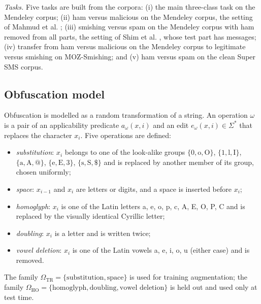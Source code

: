 

\emph{Tasks.} Five tasks are built from the corpora: (i) the main three-class task on the Mendeley corpus; (ii) ham versus malicious on the Mendeley corpus, the setting of Mahmud et al. \cite{mahmud2024}; (iii) smishing versus spam on the Mendeley corpus with ham removed from all parts, the setting of Shim et al. \cite{shim2024}, whose test part has  messages; (iv) transfer from ham versus malicious on the Mendeley corpus to legitimate versus smishing on MOZ-Smishing; and (v) ham versus spam on the clean Super SMS corpus.

\subsection{Obfuscation model}\label{sec:obfuscation}

Obfuscation is modelled as a random transformation of a string. An operation $\omega$ is a pair of an applicability predicate $a_\omega(x,i)$ and an edit $e_\omega(x,i)\in\Sigma^{*}$ that replaces the character $x_i$. Five operations are defined:
\begin{itemize}
\item \emph{substitution}: $x_i$ belongs to one of the look-alike groups $\{0,\mathrm{o},\mathrm{O}\}$, $\{1,\mathrm{l},\mathrm{I}\}$, $\{\mathrm{a},\mathrm{A},@\}$, $\{\mathrm{e},\mathrm{E},3\}$, $\{\mathrm{s},\mathrm{S},\$\}$ and is replaced by another member of its group, chosen uniformly;
\item \emph{space}: $x_{i-1}$ and $x_i$ are letters or digits, and a space is inserted before $x_i$;
\item \emph{homoglyph}: $x_i$ is one of the Latin letters a, e, o, p, c, A, E, O, P, C and is replaced by the visually identical Cyrillic letter;
\item \emph{doubling}: $x_i$ is a letter and is written twice;
\item \emph{vowel deletion}: $x_i$ is one of the Latin vowels a, e, i, o, u (either case) and is removed.
\end{itemize}
The family $\Omega_{\mathrm{TR}}=\{\text{substitution},\text{space}\}$ is used for training augmentation; the family $\Omega_{\mathrm{HO}}=\{\text{homoglyph},\text{doubling},\text{vowel deletion}\}$ is held out and used only at test time.

